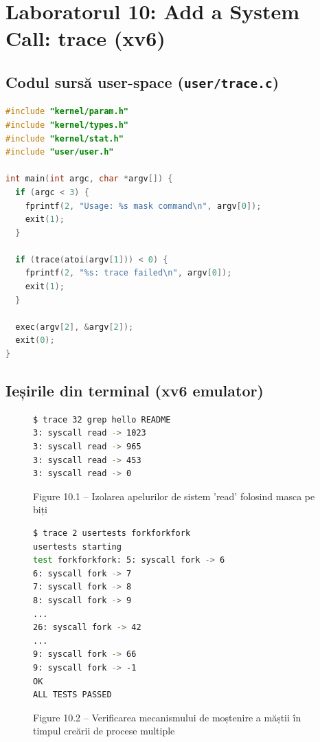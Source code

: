 \documentclass[12pt,a4paper]{article}
\begin{document}
\newpage

\section{Laboratorul 10: Add a System Call: trace (xv6)}

\subsection{Codul sursă user-space (\texttt{user/trace.c})}
\begin{lstlisting}[language=C]
#include "kernel/param.h"
#include "kernel/types.h"
#include "kernel/stat.h"
#include "user/user.h"

int main(int argc, char *argv[]) {
  if (argc < 3) {
    fprintf(2, "Usage: %s mask command\n", argv[0]);
    exit(1);
  }
  
  if (trace(atoi(argv[1])) < 0) {
    fprintf(2, "%s: trace failed\n", argv[0]);
    exit(1);
  }
  
  exec(argv[2], &argv[2]);
  exit(0);
}
\end{lstlisting}

\subsection{Ieșirile din terminal (xv6 emulator)}
\begin{figure}[h!]
\begin{lstlisting}[language=bash]
$ trace 32 grep hello README
3: syscall read -> 1023
3: syscall read -> 965
3: syscall read -> 453
3: syscall read -> 0
\end{lstlisting}
\caption{Figure 10.1 -- Izolarea apelurilor de sistem 'read' folosind masca pe biți}
\end{figure}

\begin{figure}[h!]
\begin{lstlisting}[language=bash]
$ trace 2 usertests forkforkfork
usertests starting
test forkforkfork: 5: syscall fork -> 6
6: syscall fork -> 7
7: syscall fork -> 8
8: syscall fork -> 9
...
26: syscall fork -> 42
...
9: syscall fork -> 66
9: syscall fork -> -1
OK
ALL TESTS PASSED
\end{lstlisting}
\caption{Figure 10.2 -- Verificarea mecanismului de moștenire a măștii în timpul creării de procese multiple}
\end{figure}
\end{document}
